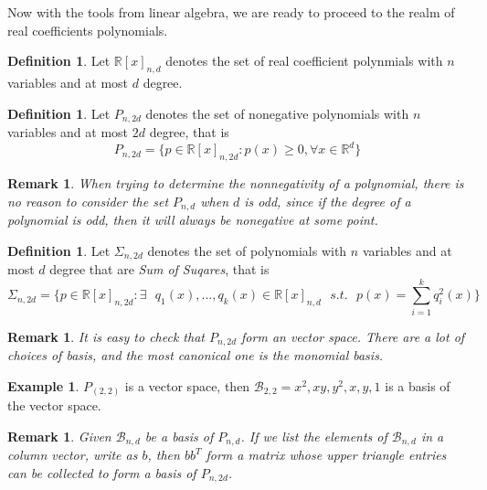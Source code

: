 \documentclass[12pt]{amsart}
\numberwithin{equation}{section}
\newtheorem{remark}[thm]{Remark}
\theoremstyle{definition}
\newtheorem{definition}[thm]{Definition}
\newtheorem{example}[thm]{Example}
\numberwithin{thm}{section}
\begin{document}
Now with the tools from linear algebra, we are ready to proceed to the realm of real coefficients polynomials.

\begin{definition}
     Let $\mathbb{R}[x]_{n,d}$ denotes the set of real coefficient 
     polynmials with $n$ variables and at most $d$ degree.
\end{definition}

\begin{definition}
     Let $P_{n, 2d}$ denotes the set of nonegative polynomials with 
     $n$ variables and at most $2d$ degree, that is 
     \begin{equation}
          P_{n, 2d} = \{ p \in \mathbb{R}[x]_{n, 2d}: p(x) \geq 0, \forall x \in \mathbb{R}^d \}
     \end{equation}
\end{definition}

\begin{remark}
     When trying to determine the nonnegativity of a polynomial, there is no reason to consider the set $P_{n, d}$ when $d$ is odd, since if the 
     degree of a polynomial is odd, then it will always be nonegative at some point.
\end{remark}

\begin{definition}
     Let $\Sigma_{n,2d}$ denotes the set of polynomials with $n$ variables and at most
     $d$ degree that are \emph{Sum of Suqares}, that is
     \begin{equation}
          \Sigma_{n, 2d} = \{ p \in \mathbb{R}[x]_{n, 2d}: \exists \text{ } q_1(x), ..., q_k(x) \in \mathbb{R}[x]_{n,d} \text{ } s.t. \text{ }  p(x) = \sum_{i=1}^k q_i^2(x)\}
     \end{equation}     
\end{definition}

\begin{remark}
     It is easy to check that $P_{n, 2d}$ form an vector space. There are a lot of choices of basis, and the most canonical one is the monomial basis.
\end{remark}

\begin{example}
     $P_(2, 2)$ is a vector space, then $\mathcal{B}_{2, 2} = {x^2, xy, y^2, x, y, 1}$ is a basis of the vector space.
\end{example}

\begin{remark}
     Given $\mathcal{B}_{n, d}$ be a basis of $P_{n, d}$. If we list the elements of $\mathcal{B}_{n, d}$ in a column vector, write as $b$, then $b b^T$ form a matrix whose upper triangle entries can be collected to form a basis of $P_{n, 2d}$.
\end{remark}
\end{document}

